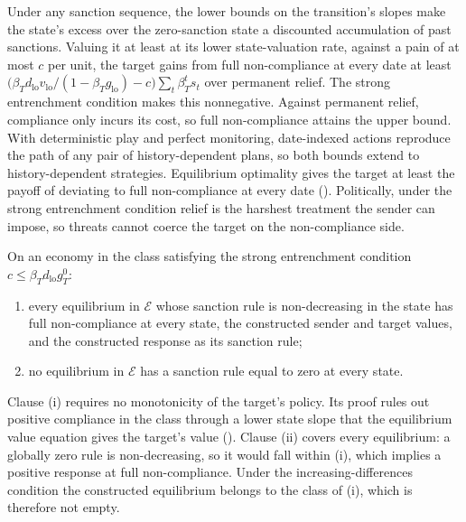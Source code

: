  Under any sanction sequence, the lower bounds on the transition's
slopes make the state's excess over the zero-sanction state a discounted
accumulation of past sanctions. Valuing it at least at its lower state-valuation
rate, against a pain of at most $c$ per unit, the target gains from full
non-compliance at every date at least
$\bigl(\beta_Td_{\mathrm{lo}}v_{\mathrm{lo}}/(1-\beta_Tg_{\mathrm{lo}})-c\bigr)\sum_t\beta_T^ts_t$
over permanent relief. The strong entrenchment condition makes this nonnegative.
Against permanent relief, compliance only incurs its cost, so full non-compliance
attains the upper bound. With deterministic play and perfect monitoring,
date-indexed actions reproduce the path of any pair of history-dependent plans,
so both bounds extend to history-dependent strategies. Equilibrium optimality gives the target at least the payoff of
deviating to full non-compliance at every date ().
Politically, under the strong entrenchment condition relief is the harshest
treatment the sender can impose, so threats cannot coerce the target on the
non-compliance side.


\begin{proposition}
\label{prop:identification}
On an economy in the class satisfying the strong entrenchment condition
$c\le\beta_Td_{\mathrm{lo}}g_T^0$:
\begin{enumerate}[label=(\roman*)]
\item every equilibrium in $\mathcal E$ whose sanction rule is
non-decreasing in the state has full non-compliance at every state, the constructed
sender and target values, and the constructed response as its sanction rule;
\item no equilibrium in $\mathcal E$ has a sanction rule equal to zero at
every state.
\end{enumerate}
\end{proposition}

 Clause (i) requires no monotonicity of the target's policy.
Its proof rules out positive compliance in the class through a lower state slope
that the equilibrium value equation gives the target's value
(). Clause (ii) covers every equilibrium: a
globally zero rule is non-decreasing, so it would fall within (i), which implies
a positive response at full non-compliance. Under the increasing-differences
condition the constructed equilibrium belongs to the class of (i), which is
therefore not empty.


